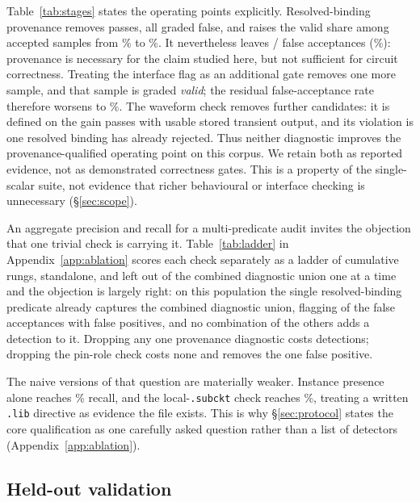 Table~\ref{tab:stages} states the operating points explicitly.
Resolved-binding provenance removes \ProvTP{} passes, all graded false, and
raises the valid share among accepted samples from
\StageNumericValidShare{}\% to \StageProvValidShare{}\%. It nevertheless
leaves \ProvFN{}/\StageProvAccepted{} false acceptances
(\StageProvFalseShare{}\%): provenance is necessary for the claim studied
here, but not sufficient for circuit correctness. Treating the interface flag
as an additional gate removes one more sample, and that sample is graded
\emph{valid}; the residual false-acceptance rate therefore worsens to
\StageIfaceFalseShare{}\%. The waveform check removes
\StageWaveRemoved{} further candidates: it is defined on the
\WaveEvaluated{} gain passes with usable stored transient output, and its
\WaveViolations{} violation is one resolved binding has already rejected.
Thus neither diagnostic improves the provenance-qualified operating point on
this corpus. We retain both as reported evidence, not as demonstrated
correctness gates. This is a property of the single-scalar suite, not evidence
that richer behavioural or interface checking is unnecessary
(\S\ref{sec:scope}).



An aggregate precision and recall for a multi-predicate audit invites the
objection that one trivial check is carrying it. Table~\ref{tab:ladder} in
Appendix~\ref{app:ablation} scores each check separately as a ladder of
cumulative rungs, standalone, and left out of the combined diagnostic union
one at a time and the objection is largely right: on this population
the single resolved-binding predicate already captures the combined
diagnostic union, flagging
\ProvTP{} of the \FalseAcceptTotal{} false acceptances with \ProvFP{} false
positives, and no combination of the others adds a detection to it. Dropping
any one provenance diagnostic costs \UniqueSubstituted{} detections;
dropping the pin-role check costs none and removes the one false positive.

The naive versions of that question are materially weaker. Instance
presence alone reaches \SoloNoPartRecall{}\% recall, and the
local-\texttt{.subckt} check reaches \SoloSubstitutedRecall{}\%, treating a
written \texttt{.lib} directive as evidence the file exists. This is why
\S\ref{sec:protocol} states the core qualification as one carefully asked
question rather than a list of detectors (Appendix~\ref{app:ablation}).

\subsection{Held-out validation}
\label{sec:heldout}

